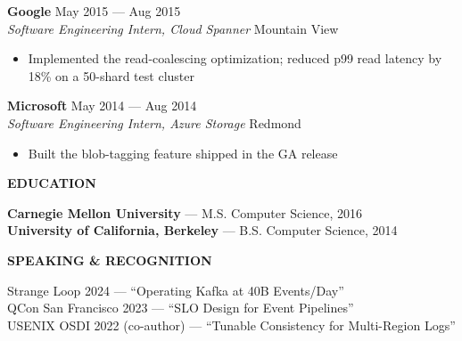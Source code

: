 \documentclass[letterpaper,10pt]{article}
\newcommand{\mainhead}[1]{%
  \vspace{12pt}
  {\bfseries\fontsize{11}{14}\selectfont\textcolor{modAccent}{\MakeUppercase{#1}}}
  \vspace{4pt}
}
\begin{document}
\begin{minipage}[t]{5.4in}
\vspace{4pt}
\noindent\textbf{Google} \hfill \textcolor{modSec}{May 2015 --- Aug 2015} \\
\textit{Software Engineering Intern, Cloud Spanner} \hfill \textcolor{modSec}{Mountain View}
\begin{itemize}
  \item Implemented the read-coalescing optimization; reduced p99 read latency by 18\% on a 50-shard test cluster
\end{itemize}

\vspace{4pt}
\noindent\textbf{Microsoft} \hfill \textcolor{modSec}{May 2014 --- Aug 2014} \\
\textit{Software Engineering Intern, Azure Storage} \hfill \textcolor{modSec}{Redmond}
\begin{itemize}
  \item Built the blob-tagging feature shipped in the GA release
\end{itemize}

\mainhead{Education}
\textbf{Carnegie Mellon University} --- M.S. Computer Science, 2016 \\
\textbf{University of California, Berkeley} --- B.S. Computer Science, 2014

\mainhead{Speaking \& Recognition}
Strange Loop 2024 --- ``Operating Kafka at 40B Events/Day'' \\
QCon San Francisco 2023 --- ``SLO Design for Event Pipelines'' \\
USENIX OSDI 2022 (co-author) --- ``Tunable Consistency for Multi-Region Logs''

\end{minipage}
\end{document}
